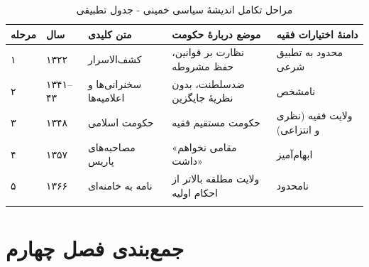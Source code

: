 \documentclass[12pt,a4paper]{book}
\begin{document}
\begin{longtable}{%
    >{\centering\arraybackslash}p{}
    >{\raggedleft\arraybackslash}p{}
    >{\raggedleft\arraybackslash}p{}
    >{\raggedleft\arraybackslash}p{}
    >{\raggedleft\arraybackslash}p{}}
\toprule
\rowcolor{cGold!15}
\textbf{مرحله} & \textbf{سال} & \textbf{متن کلیدی} & \textbf{موضع دربارهٔ حکومت} & \textbf{دامنهٔ اختیارات فقیه} \\
\midrule
\endhead

\cellcolor{cGreen!8} ۱ & \cellcolor{cGreen!8} ۱۳۲۲ & \cellcolor{cGreen!8} کشف‌الاسرار & \cellcolor{cGreen!8} نظارت بر قوانین، حفظ مشروطه & \cellcolor{cGreen!8} محدود به تطبیق شرعی \\
\midrule

\cellcolor{cGold!8} ۲ & \cellcolor{cGold!8} ۱۳۴۱–۴۳ & \cellcolor{cGold!8} سخنرانی‌ها و اعلامیه‌ها & \cellcolor{cGold!8} ضدسلطنت، بدون نظریهٔ جایگزین & \cellcolor{cGold!8} نامشخص \\
\midrule

\cellcolor{cWarn!8} ۳ & \cellcolor{cWarn!8} ۱۳۴۸ & \cellcolor{cWarn!8} حکومت اسلامی & \cellcolor{cWarn!8} حکومت مستقیم فقیه & \cellcolor{cWarn!8} ولایت فقیه (نظری و انتزاعی) \\
\midrule

\cellcolor{cPrimary!8} ۴ & \cellcolor{cPrimary!8} ۱۳۵۷ & \cellcolor{cPrimary!8} مصاحبه‌های پاریس & \cellcolor{cPrimary!8} «مقامی نخواهم داشت» & \cellcolor{cPrimary!8} ابهام‌آمیز \\
\midrule

\cellcolor{cAccent!8} ۵ & \cellcolor{cAccent!8} ۱۳۶۶ & \cellcolor{cAccent!8} نامه به خامنه‌ای & \cellcolor{cAccent!8} ولایت مطلقه بالاتر از احکام اولیه & \cellcolor{cAccent!8} نامحدود \\

\bottomrule
\caption{مراحل تکامل اندیشهٔ سیاسی خمینی - جدول تطبیقی}
\label{tab:evolution-stages}
\end{longtable}

\section{جمع‌بندی فصل چهارم}
\end{document}
